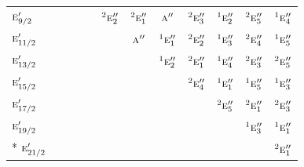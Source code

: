 \documentclass[10pt,a4paper]{article}
\numberwithin{equation}{section}
\newcommand{\irr}[1]{\text{\normalfont\scshape #1}}
\newcommand{\conjpair}[1]{{}^{#1}}
\begin{document}
{\begin{longtable}{@{}lccccccccccc@{}}
$\irr{e}_{9/2}'$ &  &  &  &  & $\conjpair{2}\irr{e}_{2}''$ & $\conjpair{2}\irr{e}_{1}''$ & $\irr{a}''$ & $\conjpair{2}\irr{e}_{3}''$ & $\conjpair{1}\irr{e}_{2}''$ & $\conjpair{2}\irr{e}_{5}''$ & $\conjpair{1}\irr{e}_{4}''$\\
$\irr{e}_{11/2}'$ &  &  &  &  &  & $\irr{a}''$ & $\conjpair{1}\irr{e}_{1}''$ & $\conjpair{2}\irr{e}_{2}''$ & $\conjpair{1}\irr{e}_{3}''$ & $\conjpair{2}\irr{e}_{4}''$ & $\conjpair{1}\irr{e}_{5}''$\\
$\irr{e}_{13/2}'$ &  &  &  &  &  &  & $\conjpair{1}\irr{e}_{2}''$ & $\conjpair{2}\irr{e}_{1}''$ & $\conjpair{1}\irr{e}_{4}''$ & $\conjpair{2}\irr{e}_{3}''$ & $\conjpair{2}\irr{e}_{5}''$\\
$\irr{e}_{15/2}'$ &  &  &  &  &  &  &  & $\conjpair{2}\irr{e}_{4}''$ & $\conjpair{1}\irr{e}_{1}''$ & $\conjpair{1}\irr{e}_{5}''$ & $\conjpair{1}\irr{e}_{3}''$\\
$\irr{e}_{17/2}'$ &  &  &  &  &  &  &  &  & $\conjpair{2}\irr{e}_{5}''$ & $\conjpair{2}\irr{e}_{1}''$ & $\conjpair{2}\irr{e}_{3}''$\\
$\irr{e}_{19/2}'$ &  &  &  &  &  &  &  &  &  & $\conjpair{1}\irr{e}_{3}''$ & $\conjpair{1}\irr{e}_{1}''$\\*
$\irr{e}_{21/2}'$ &  &  &  &  &  &  &  &  &  &  & $\conjpair{2}\irr{e}_{1}''$\\
\bottomrule\end{longtable}}
\end{document}
